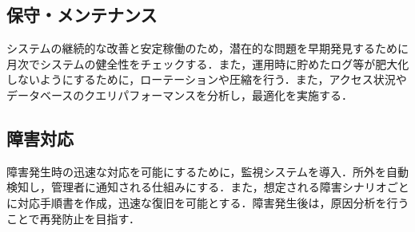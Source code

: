 \subsection{保守・メンテナンス}
システムの継続的な改善と安定稼働のため，潜在的な問題を早期発見するために月次でシステムの健全性をチェックする．また，運用時に貯めたログ等が肥大化しないようにするために，ローテーションや圧縮を行う．また，アクセス状況やデータベースのクエリパフォーマンスを分析し，最適化を実施する．


\subsection{障害対応}
障害発生時の迅速な対応を可能にするために，監視システムを導入．所外を自動検知し，管理者に通知される仕組みにする．また，想定される障害シナリオごとに対応手順書を作成，迅速な復旧を可能とする．障害発生後は，原因分析を行うことで再発防止を目指す．
